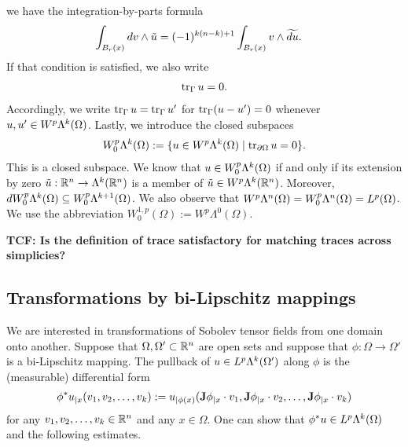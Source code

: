 \documentclass[10pt,a4paper]{article}
\newcommand\cye[1]{%
\protect\leavevmode
\begingroup
    \color{blue}%
    #1%
\endgroup
}
\newcommand{\todo}[1]{{\color{RedOrange}\textbf{#1}}}
\begin{document}
we have the integration-by-parts formula
\begin{align*}
    \int_{B_r(x)} d v \wedge \tilde u
    &=
    (-1)^{k(n-k)+1}
    \int_{B_r(x)} v \wedge \widetilde{d u}
    .
\end{align*}
If that condition is satisfied, we also write 
\begin{align*}
    \operatorname{tr}_{\Gamma} u = 0
    .
\end{align*}
Accordingly, we write $\operatorname{tr}_{\Gamma} u = \operatorname{tr}_{\Gamma} u'$ for $\operatorname{tr}_{\Gamma} (u-u') = 0$ whenever $u, u' \in W^{p}\Lambda^{k}(\Omega)$.
Lastly, we introduce the closed subspaces 
\begin{gather*}
    W^{p}_{0}\Alt^{k}(\Omega) 
    := 
    \{ u \in W^{p}\Alt^{k}(\Omega) \suchthat \trace_{\partial \Omega} u = 0 \}
    .
\end{gather*}
This is a closed subspace. We know that $u \in W^{p}_{0}\Lambda^{k}(\Omega)$ if and only if its extension by zero $\tilde u : {\mathbb R}^{n} \rightarrow \Lambda^{k}({\mathbb R}^{n})$ is a member of $\tilde u \in W^{p}\Lambda^{k}({\mathbb R}^{n})$. Moreover, $d W^{p}_{0}\Lambda^{k}(\Omega) \subseteq W^{p}_{0}\Lambda^{k+1}(\Omega)$. We also observe that $W^{p}\Lambda^{n}(\Omega) = W^{p}_{0}\Lambda^{n}(\Omega) = L^{p}(\Omega)$. We use the abbreviation $W^{1,p}_{0}(\Omega) := W^{p}\Lambda^{0}(\Omega)$. 

\todo{TCF: Is the definition of trace satisfactory for matching traces across simplicies?}

\subsection{Transformations by bi-Lipschitz mappings}

We are interested in transformations of Sobolev tensor fields from one domain onto another. 
Suppose that $\Omega,\Omega' \subset {\mathbb R}^{n}$ are open sets and suppose that $\phi: \Omega \to \Omega'$ is a bi-Lipschitz mapping.
The pullback of $u \in L^{p}\Lambda^{k}(\Omega')$ along $\phi$ is the (measurable) differential form 
\begin{align} \label{equation:pullback}
    \phi^{\ast}u_{|x}( v_{1}, v_{2}, \ldots, v_{k} ) 
    := 
    u_{|\phi(x)}( {\mathbf{J}}\phi_{|x} \cdot v_1, {\mathbf{J}}\phi_{|x} \cdot v_2, \ldots, {\mathbf{J}}\phi_{|x} \cdot v_k ) 
\end{align}
for any $v_1, v_2, \dots, v_k \in {\mathbb R}^{n}$ and any $x \in \Omega$. 
One can show that $\phi^{\ast}u \in L^{p}\Lambda^{k}(\Omega)$ and the following estimates.
\end{document}
